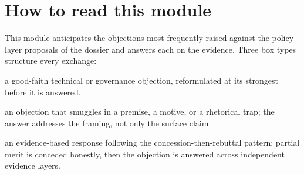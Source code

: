 
\section*{How to read this module}

This module anticipates the objections most frequently raised against the
policy-layer proposals of the dossier and answers each on the evidence. Three
box types structure every exchange:

\begin{description}[nosep,leftmargin=2em]
  \item[\textcolor{red!60!black}{\textbf{Question}}] a good-faith technical or
    governance objection, reformulated at its strongest before it is answered.
  \item[\textcolor{orange!70!black}{\textbf{Insidious framing}}] an objection
    that smuggles in a premise, a motive, or a rhetorical trap; the answer
    addresses the framing, not only the surface claim.
  \item[\textcolor{OliveGreen!60!black}{\textbf{Answer}}] an
    evidence-based response following the concession-then-rebuttal pattern:
    partial merit is conceded honestly, then the objection is answered across
    independent evidence layers.
\end{description}

